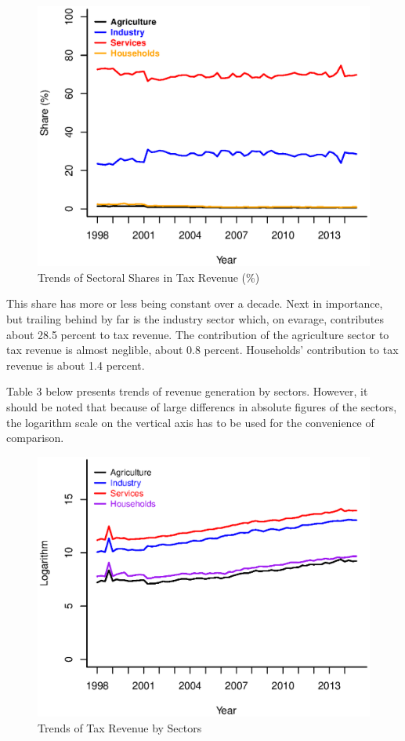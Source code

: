 \documentclass[12pt,a4paper,final]{article}
\begin{document}
\begin{figure}[hbt]
\centering
\begin{small}
\caption{Trends of Sectoral Shares in Tax Revenue (\%)}
\end{small}
\includegraphics[scale=0.501]{rev_sec_shares.eps} 
\end{figure}

This share has more or less being constant over a decade. Next in importance, but trailing behind by far is the industry sector which, on evarage, contributes about 28.5 percent to tax revenue. The contribution of the agriculture sector to tax revenue is almost neglible, about 0.8 percent.  Households' contribution to tax revenue is about 1.4 percent.

Table 3 below presents trends of revenue generation by sectors. However, it should be noted that because of large differencs in absolute figures of the sectors, the logarithm scale on the vertical axis has to be used for the convenience of comparison.

\begin{figure}[ht]
\centering
\begin{small}
\caption{Trends of Tax Revenue by Sectors}
\end{small}
\includegraphics[scale=0.501]{rev_sec_trends.eps} 
\end{figure}
\end{document}
